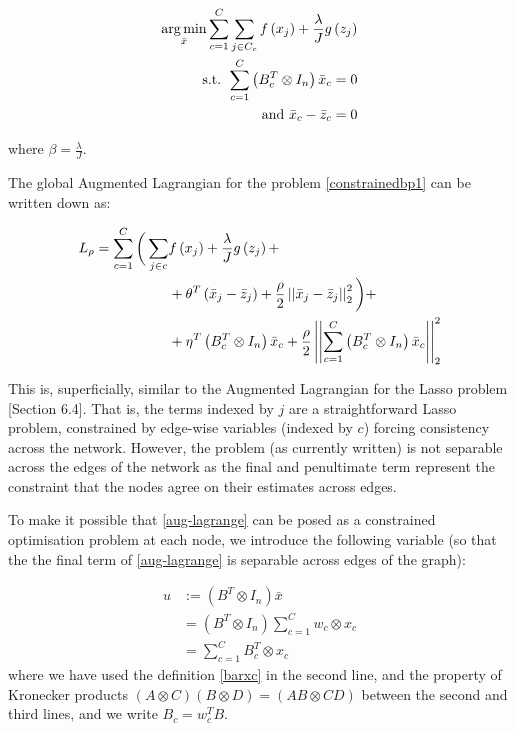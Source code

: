 \begin{align}
\operatorname*{arg\,min}_{\bar{x}} \sum_{c=1}^C \sum_{j \in C_c} f\left(x_j\right) + \frac{\lambda}{J} g\left(z_j\right)
\nonumber \\
\text{ s.t. } \sum_{c=1}^C\left(B_c^T \otimes I_n\right)\bar{x}_c = 0 \nonumber \\
\text{ and } \bar{x}_c - \bar{z}_c = 0
\label{constrainedbp1}
\end{align}

where \(\beta = \frac{\lambda}{J}\).

The global Augmented Lagrangian \cite{Boyd2010a}
 for the problem \eqref{constrainedbp1} can be written down as:

\begin{align}
L_\rho = \sum_{c=1}^C  \bigg( \sum_{j \in c} & f\left(x_j\right) + \frac{\lambda}{J} g\left(z_j\right)  + \nonumber \\ & + \theta^T\left(\bar{x}_j - \bar{z}_j\right)  +  \frac{\rho}{2}\left|\left|\bar{x}_j-\bar{z}_j\right|\right|_2^2 \bigg) + \nonumber \\  & + \eta^T\left(B_c^T \otimes I_n\right)\bar{x}_c + \frac{\rho}{2}\left|\left|\sum_{c=1}^C\left(B_c^T \otimes I_n\right)\bar{x}_c\right|\right|_2^2
\label{aug-lagrange}
\end{align}

This is, superficially, similar to the Augmented Lagrangian for the Lasso problem \cite{Boyd2010a}[Section 6.4]. That is, the terms indexed by \(j\) are a straightforward Lasso problem, constrained by edge-wise variables (indexed by \(c\)) forcing consistency across the network. However, the problem (as currently written) is not separable across the edges of the network as the final and penultimate term represent the constraint that the nodes agree on their estimates across edges. 

To make it possible that \ref{aug-lagrange} can be posed  as a constrained optimisation problem at each node, we introduce the following variable (so that the the final term of \ref{aug-lagrange} is separable across edges of the graph):

\begin{defn}
\begin{align*}
u &:= \left(B^T \otimes I_n\right)\bar{x} \\
& = \left(B^T \otimes I_n\right)\sum_{c=1}^C w_c \otimes x_c \\
& = \sum	_{c=1}^C B_c^T\otimes x_c
\end{align*}
where we have used the definition \eqref{barxc} in the second line, and the property of Kronecker products \((A\otimes C)(B \otimes D) = (AB \otimes CD)\) between the second and third lines, and we write \(B_c = w_c^TB\).
\end{defn}

